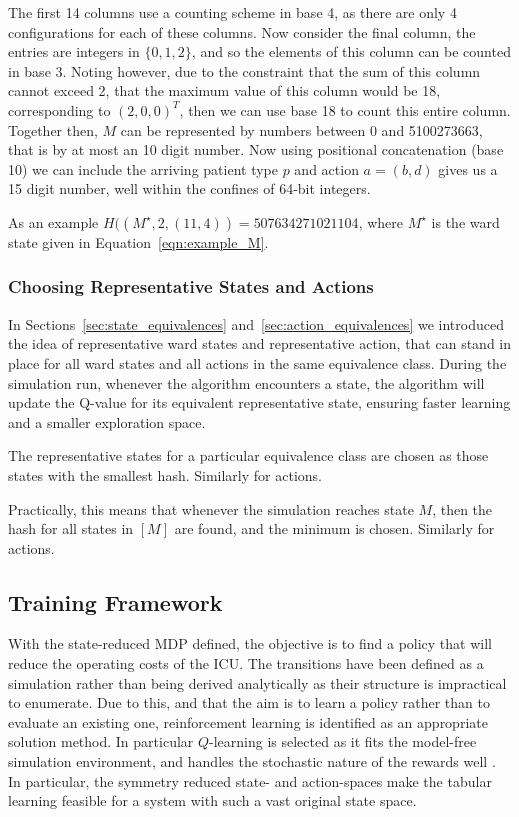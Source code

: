 \documentclass{article}
\begin{document}
The first 14 columns use a counting scheme in base 4, as there are only 4
configurations for each of these columns.
Now consider the final column, the entries are integers in $\{0, 1, 2\}$, and so
the elements of this column can be counted in base 3.
Noting however, due to the constraint that the sum of this column cannot exceed
2, that the maximum value of this column would be 18, corresponding to
$(2, 0, 0)^T$, then we can use base 18 to count this entire column.
Together then, $M$ can be represented by numbers between 0 and 5100273663, that
is by at most an 10 digit number.
Now using positional concatenation (base 10) we can include the arriving patient
type $p$ and action $a = (b, d)$ gives us a 15 digit number, well within the
confines of 64-bit integers.

As an example $H((M^{\star}, 2, (11, 4)) = 507634271021104$, where $M^{\star}$
is the ward state given in Equation~\ref{eqn:example_M}.


\subsubsection{Choosing Representative States and Actions}\label{sec:representative}
In Sections~\ref{sec:state_equivalences} and~\ref{sec:action_equivalences} we
introduced the idea of representative ward states and representative action,
that can stand in place for all ward states and all actions in the same
equivalence class.
During the simulation run, whenever the algorithm encounters a state, the
algorithm will update the Q-value for its equivalent representative state,
ensuring faster learning and a smaller exploration space.

The representative states for a particular equivalence class are chosen as
those states with the smallest hash.
Similarly for actions.

Practically, this means that whenever the simulation reaches state $M$, then
the hash for all states in $[M]$ are found, and the minimum is chosen.
Similarly for actions.


\subsection{Training Framework}\label{sec:training_framework}
With the state-reduced MDP defined, the objective is to find a policy that will
reduce the operating costs of the ICU.
The transitions have been defined as a simulation rather than being derived
analytically as their structure is impractical to enumerate.
Due to this, and that the aim is to learn a policy rather than to evaluate an
existing one, reinforcement learning is identified as an appropriate solution
method.
In particular $Q$-learning is selected as it fits the model-free simulation
environment, and handles the stochastic nature of the rewards well
\cite{suttonbarto1998}.
In particular, the symmetry reduced state- and action-spaces make the tabular
learning feasible for a system with such a vast original state space.
\end{document}

